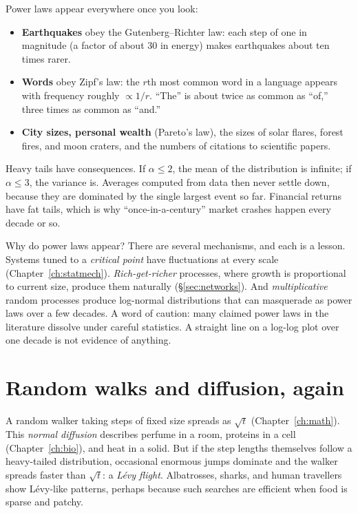 Power laws appear everywhere once you look:
\begin{itemize}[itemsep=3pt]
  \item \textbf{Earthquakes} obey the Gutenberg--Richter law: each step of one in magnitude (a factor of about $30$ in energy) makes earthquakes about ten times rarer.
  \item \textbf{Words} obey Zipf's law: the $r$th most common word in a language appears with frequency roughly $\propto1/r$. ``The'' is about twice as common as ``of,'' three times as common as ``and.''
  \item \textbf{City sizes, personal wealth} (Pareto's law), the sizes of solar flares, forest fires, and moon craters, and the numbers of citations to scientific papers.
\end{itemize}
Heavy tails have consequences. If $\alpha\le2$, the mean of the distribution is infinite; if $\alpha\le3$, the variance is. Averages computed from data then never settle down, because they are dominated by the single largest event so far. Financial returns have fat tails, which is why ``once-in-a-century'' market crashes happen every decade or so.

Why do power laws appear? There are several mechanisms, and each is a lesson. Systems tuned to a \emph{critical point} have fluctuations at every scale (Chapter~\ref{ch:statmech}). \emph{Rich-get-richer} processes, where growth is proportional to current size, produce them naturally (\S\ref{sec:networks}). And \emph{multiplicative} random processes produce log-normal distributions that can masquerade as power laws over a few decades. A word of caution: many claimed power laws in the literature dissolve under careful statistics. A straight line on a log-log plot over one decade is not evidence of anything.

\section{Random walks and diffusion, again}

A random walker taking steps of fixed size spreads as $\sqrt t$ (Chapter~\ref{ch:math}). This \emph{normal diffusion} describes perfume in a room, proteins in a cell (Chapter~\ref{ch:bio}), and heat in a solid. But if the step lengths themselves follow a heavy-tailed distribution, occasional enormous jumps dominate and the walker spreads faster than $\sqrt t$: a \emph{L\'evy flight}. Albatrosses, sharks, and human travellers show L\'evy-like patterns, perhaps because such searches are efficient when food is sparse and patchy.

